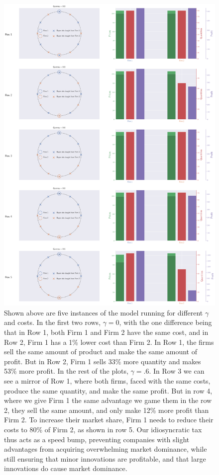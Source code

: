 \documentclass[11pt]{article}
\begin{document}
\begin{figure}
  \includegraphics[width=\linewidth]{5x2plot.png}
  \caption{Shown above are five instances of the model running for different
  $\gamma$ and costs. In the first two rows, $\gamma=0$, with the one
  difference being that in Row 1, both Firm 1 and Firm 2 have the same cost,
  and in Row 2, Firm 1 has a 1\% lower cost than Firm 2. In Row 1, the firms
  sell the same amount of product and make the same amount of profit. But in
  Row 2, Firm 1 sells 33\% more quantity and makes 53\% more profit.
  In the rest of the plots, $\gamma = .6$. In Row 3 we can see a mirror of Row
  1, where both firms, faced with the same costs, produce the same quantity,
  and make the same profit. But in row 4, where we give Firm 1
  the same advantage we game them in the row 2, they sell the same amount, and
  only make 12\% more profit than Firm 2. To increase their market share,
  Firm 1 needs to reduce their costs to 80\% of Firm 2, as shown in row 5.
  Our idiosyncratic tax thus acts as a speed bump, preventing companies with
  slight advantages from acquiring overwhelming market dominance, while still
  ensuring that minor innovations are profitable, and that large innovations do
  cause market dominance.}
  \label{fig:fig3x2SingleTimestep}
\end{figure}
\end{document}
